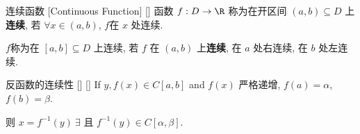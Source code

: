 \documentclass[UTF8]{ctexart}
\begin{document}
			\begin{dfn}
			    []
			    {连续函数}
			    [Continuous Function]
			    []
				函数 \(f:D\to\R\) 称为在开区间 \((a,b)\subseteq D\) 上\textbf{连续}, 若 \(\forall x\in(a,b)\), \(f\)在 \(x\) 处连续. 

				\(f\)称为在 \([a,b]\subseteq D\) 上连续, 若 \(f\) 在 \((a,b)\) 上\textbf{连续}, 在 \(a\) 处右连续, 在 \(b\) 处左连续. 
			\end{dfn}

   			\begin{ppt}
			    []
			    {反函数的连续性}
			    []
			    []
				If \(y, f(x) \in C[a, b]\) and \(f(x)\) 严格递增, \(f(a) = \alpha\), \(f(b) = \beta\).

                则 \(x = f^{-1}(y)\ \exists\) 且 \(f^{-1}(y) \in C\left[\alpha, \beta\right]\).
			\end{ppt}
\end{document}
